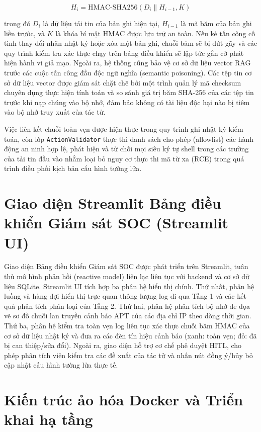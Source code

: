 \begin{equation}
    H_i = \text{HMAC-SHA256}(D_i \parallel H_{i-1}, K)
\end{equation}

trong đó $D_i$ là dữ liệu tải tin của bản ghi hiện tại, $H_{i-1}$ là mã băm của bản ghi liền trước, và $K$ là khóa bí mật HMAC được lưu trữ an toàn. Nếu kẻ tấn công cố tình thay đổi nhãn nhật ký hoặc xóa một bản ghi, chuỗi băm sẽ bị đứt gãy và các quy trình kiểm tra xác thực chạy trên bảng điều khiển sẽ lập tức gắn cờ phát hiện hành vi giả mạo. Ngoài ra, hệ thống cũng bảo vệ cơ sở dữ liệu vector RAG trước các cuộc tấn công đầu độc ngữ nghĩa (semantic poisoning). Các tệp tin cơ sở dữ liệu vector được giám sát chặt chẽ bởi một trình quản lý mã checksum chuyên dụng thực hiện tính toán và so sánh giá trị băm SHA-256 của các tệp tin trước khi nạp chúng vào bộ nhớ, đảm bảo không có tài liệu độc hại nào bị tiêm vào bộ nhớ truy xuất của tác tử.

Việc liên kết chuỗi toàn vẹn được hiện thực trong quy trình ghi nhật ký kiểm toán, còn lớp \texttt{ActionValidator} thực thi danh sách cho phép (allowlist) các hành động an ninh hợp lệ, phát hiện và từ chối mọi siêu ký tự shell trong các trường của tải tin đầu vào nhằm loại bỏ nguy cơ thực thi mã từ xa (RCE) trong quá trình điều phối kịch bản cấu hình tường lửa.

\section{Giao diện Streamlit Bảng điều khiển Giám sát SOC (Streamlit UI)}

Giao diện Bảng điều khiển Giám sát SOC được phát triển trên Streamlit, tuân thủ mô hình phản hồi (reactive model) liên lạc liên tục với backend và cơ sở dữ liệu SQLite. Streamlit UI tích hợp ba phân hệ hiển thị chính. Thứ nhất, phân hệ luồng và hàng đợi hiển thị trực quan thông lượng log đi qua Tầng 1 và các kết quả phân tích phân loại của Tầng 2. Thứ hai, phân hệ phân tích bộ nhớ đe dọa vẽ sơ đồ chuỗi lan truyền cảnh báo APT của các địa chỉ IP theo dòng thời gian. Thứ ba, phân hệ kiểm tra toàn vẹn log liên tục xác thực chuỗi băm HMAC của cơ sở dữ liệu nhật ký và đưa ra các đèn tín hiệu cảnh báo (xanh: toàn vẹn; đỏ: đã bị can thiệp/sửa đổi). Ngoài ra, giao diện hỗ trợ cơ chế phê duyệt HITL, cho phép phân tích viên kiểm tra các đề xuất của tác tử và nhấn nút đồng ý/hủy bỏ cập nhật cấu hình tường lửa thực tế.

\section{Kiến trúc ảo hóa Docker và Triển khai hạ tầng}

